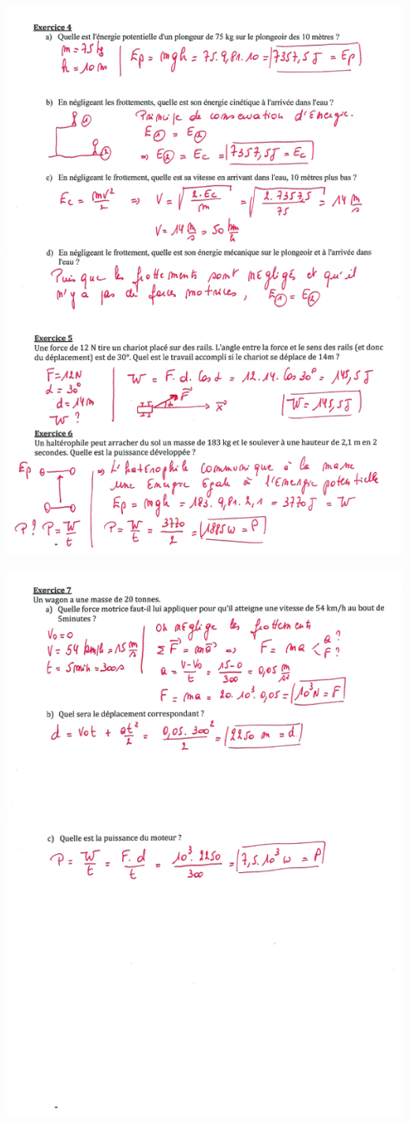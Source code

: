 \includegraphics[width=16cm]{Pictures/100000010000024A00000328B79BD0C63CC6F682.png}

\includegraphics[width=16cm]{Pictures/100000010000024A0000032885BF0DEB477D1AAA.png}


